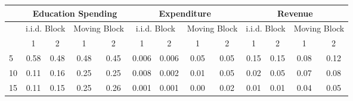 %
\begin{tabular}{@{}lcccccccccccc@{}}
	\toprule
	& \multicolumn{4}{c}{ Education Spending } & \multicolumn{4}{c}{ Expenditure } & \multicolumn{4}{c}{ Revenue } \\ \hline
	& \multicolumn{2}{c}{ i.i.d. Block } & \multicolumn{2}{c}{ Moving Block } & \multicolumn{2}{c}{ i.i.d. Block } & \multicolumn{2}{c}{ Moving Block } & \multicolumn{2}{c}{ i.i.d. Block } & \multicolumn{2}{c}{ Moving Block }\\
	\hline
	\diagbox{$\tau$}{$q$} & 1 & 2 & 1 & 2 & 1 & 2 & 1 & 2 & 1 & 2 & 1 & 2 \\
	\hline
	5  & 0.58 & 0.48 & 0.48 & 0.45 & 0.006 & 0.006 & 0.05 & 0.05 & 0.15 & 0.15 & 0.08 & 0.12\\
	10 & 0.11 & 0.16 & 0.25 & 0.25 & 0.008 & 0.002 & 0.01 & 0.05 & 0.02 & 0.05 & 0.07 & 0.08 \\
	15 & 0.11 & 0.15 & 0.25 & 0.26 & 0.001 & 0.001 & 0.00 & 0.02 & 0.01 & 0.01 & 0.04 & 0.05 \\
	\bottomrule
\end{tabular}
